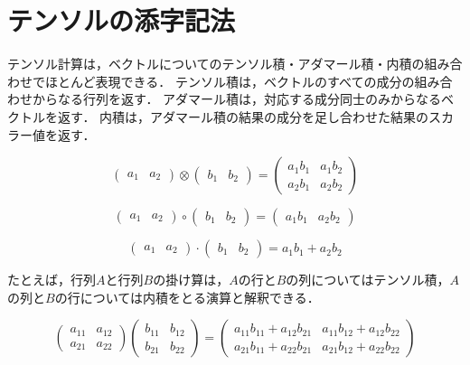 \section{テンソルの添字記法}

テンソル計算は，ベクトルについてのテンソル積・アダマール積・内積の組み合わせでほとんど表現できる．
テンソル積は，ベクトルのすべての成分の組み合わせからなる行列を返す．
アダマール積は，対応する成分同士のみからなるベクトルを返す．
内積は，アダマール積の結果の成分を足し合わせた結果のスカラー値を返す．

$$
\begin{pmatrix}
a_{1} & a_{2}
\end{pmatrix}
\otimes
\begin{pmatrix}
b_{1} & b_{2}
\end{pmatrix}
=
\begin{pmatrix}
a_{1} b_{1} & a_{1} b_{2} \\
a_{2} b_{1} & a_{2} b_{2}
\end{pmatrix}
$$

$$
\begin{pmatrix}
a_{1} & a_{2}
\end{pmatrix}
\circ
\begin{pmatrix}
b_{1} & b_{2}
\end{pmatrix}
=
\begin{pmatrix}
a_{1} b_{1} & a_{2} b_{2}
\end{pmatrix}
$$

$$
\begin{pmatrix}
a_{1} & a_{2}
\end{pmatrix}
\cdot
\begin{pmatrix}
b_{1} & b_{2}
\end{pmatrix}
=
a_{1} b_{1} + a_{2} b_{2}
$$

たとえば，行列$A$と行列$B$の掛け算は，$A$の行と$B$の列についてはテンソル積，$A$の列と$B$の行については内積をとる演算と解釈できる．

$$
\begin{pmatrix}
a_{11} & a_{12} \\
a_{21} & a_{22}
\end{pmatrix}
\begin{pmatrix}
b_{11} & b_{12} \\
b_{21} & b_{22}
\end{pmatrix}
=
\begin{pmatrix}
a_{11} b_{11} + a_{12} b_{21} & a_{11} b_{12} + a_{12} b_{22} \\
a_{21} b_{11} + a_{22} b_{21} & a_{21} b_{12} + a_{22} b_{22}
\end{pmatrix}
$$

